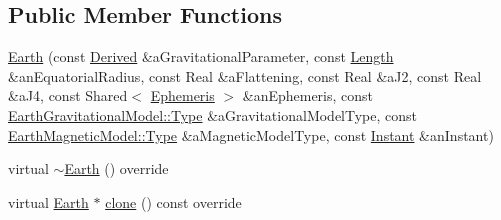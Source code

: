 \subsection*{Public Member Functions}
\begin{DoxyCompactItemize}
\item 
\hyperlink{classostk_1_1physics_1_1env_1_1obj_1_1celest_1_1_earth_ae3327b5673664451201468dd16667f42}{Earth} (const \hyperlink{classostk_1_1physics_1_1units_1_1_derived}{Derived} \&a\+Gravitational\+Parameter, const \hyperlink{classostk_1_1physics_1_1units_1_1_length}{Length} \&an\+Equatorial\+Radius, const Real \&a\+Flattening, const Real \&a\+J2, const Real \&a\+J4, const Shared$<$ \hyperlink{classostk_1_1physics_1_1env_1_1_ephemeris}{Ephemeris} $>$ \&an\+Ephemeris, const \hyperlink{classostk_1_1physics_1_1environment_1_1gravitational_1_1_earth_a9895df78b5c5aab5e981bf765f8c0f05}{Earth\+Gravitational\+Model\+::\+Type} \&a\+Gravitational\+Model\+Type, const \hyperlink{classostk_1_1physics_1_1environment_1_1magnetic_1_1_earth_a30a064d87b6fce338e76aebd3043b6b6}{Earth\+Magnetic\+Model\+::\+Type} \&a\+Magnetic\+Model\+Type, const \hyperlink{classostk_1_1physics_1_1time_1_1_instant}{Instant} \&an\+Instant)
\item 
virtual \hyperlink{classostk_1_1physics_1_1env_1_1obj_1_1celest_1_1_earth_ac718f964c68fa41331978751a9ca4818}{$\sim$\+Earth} () override
\item 
virtual \hyperlink{classostk_1_1physics_1_1env_1_1obj_1_1celest_1_1_earth}{Earth} $\ast$ \hyperlink{classostk_1_1physics_1_1env_1_1obj_1_1celest_1_1_earth_ae86664b9d6fc870baa1dac5c3219f784}{clone} () const override
\end{DoxyCompactItemize}
